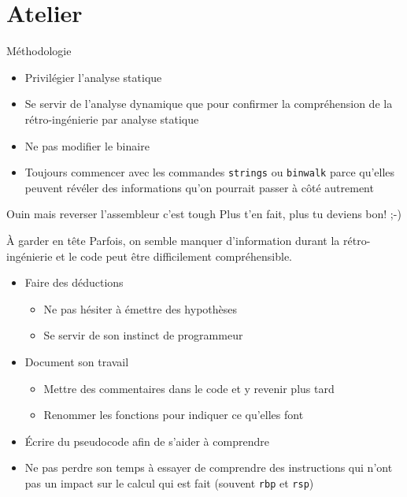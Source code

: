 \documentclass[10pt,xcolor={table,dvipsnames},t]{beamer}
\begin{document}
\section{Atelier}

\begin{frame}{Méthodologie}
    \begin{itemize}
        \item Privilégier l'analyse statique
        \item Se servir de l'analyse dynamique que pour confirmer la compréhension de la rétro-ingénierie par analyse statique
        \item Ne pas modifier le binaire
        \item Toujours commencer avec les commandes \texttt{strings} ou \texttt{binwalk} parce qu'elles peuvent révéler des informations qu'on pourrait passer à côté autrement
    \end{itemize}
    
    \begin{block}{Ouin mais reverser l'assembleur c'est tough}
        Plus t'en fait, plus tu deviens bon!  ;-)
    \end{block}
\end{frame}


\begin{frame}{À garder en tête}
    Parfois, on semble manquer d'information durant la rétro-ingénierie et le code peut être difficilement compréhensible. 
    \begin{itemize}
        \item Faire des déductions
        \begin{itemize}
            \item Ne pas hésiter à émettre des hypothèses
            \item Se servir de son instinct de programmeur
        \end{itemize}
        \item Document son travail
        \begin{itemize}
            \item Mettre des commentaires dans le code et y revenir plus tard
            \item Renommer les fonctions pour indiquer ce qu'elles font
        \end{itemize}
        \item Écrire du pseudocode afin de s'aider à comprendre
        \item Ne pas perdre son temps à essayer de comprendre des instructions qui n'ont pas un impact sur le calcul qui est fait (souvent \texttt{rbp} et \texttt{rsp})
    \end{itemize}
\end{frame}
\end{document}
